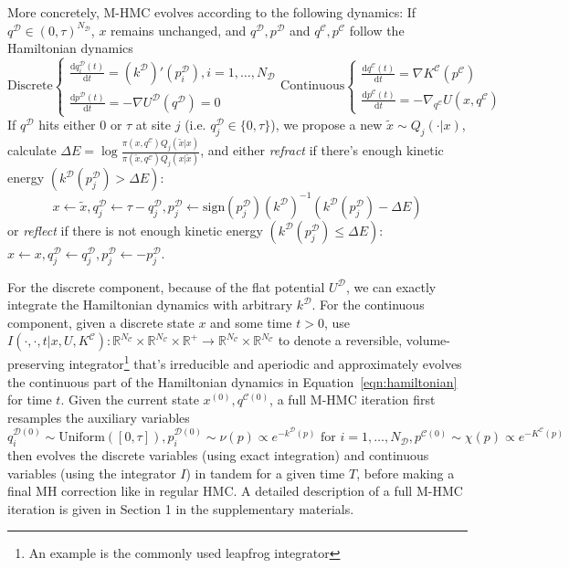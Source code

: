\documentclass{article}
\newcommand{\cald}{\mathcal{D}}
\newcommand{\calc}{\mathcal{C}}
\begin{document}
More concretely, M-HMC evolves according to the following dynamics: If $q^\cald \in (0, \tau)^{N_\cald}$, $x$ remains unchanged, and $q^\cald, p^\cald$ and $q^\calc, p^\calc$ follow the Hamiltonian dynamics
\begin{equation}\label{eqn:hamiltonian}
\text{Discrete}
\begin{cases} 
\frac{\mathrm{d} q_i^\cald(t)}{\mathrm{d} t} = (k^\cald)' (p^\cald_i), i=1, \ldots, N_\cald\\
\frac{\mathrm{d} p^\cald(t)}{\mathrm{d}t} = -\nabla U^\cald(q^\cald) = 0
\end{cases}
\text{Continuous}
\begin{cases}
\frac{\mathrm{d} q^\calc(t)}{\mathrm{d} t} = \nabla K^\calc(p^\calc)\\
\frac{\mathrm{d} p^\calc(t)}{\mathrm{d}t} = -\nabla_{q^\calc} U(x, q^\calc)
\end{cases}
\end{equation}
If $q^\cald$ hits either $0$ or $\tau$ at site $j$ (i.e. $q^\cald_j \in \{ 0, \tau \}$), we propose a new $\tilde{x}\sim Q_j(\cdot|x)$, calculate $\Delta E = \log \frac{\pi (x, q^\calc) Q_j (\tilde{x} |x)}{\pi (\tilde{x}, q^\calc) Q_j (x| \tilde{x})}$, and either \textit{refract} if there's enough kinetic energy $\left(k^\cald (p^\cald_j) > \Delta E\right)$:
\[x\leftarrow \tilde{x}, q_j^\cald\leftarrow \tau - q_j^\cald, p_j^\cald \leftarrow \text{sign}(p_j^\cald)(k^\cald)^{-1}(k^\cald(p_j^\cald) - \Delta E)\] 
or \textit{reflect} if there is not enough kinetic energy $\left(k^\cald (p^\cald_j) \leq \Delta E\right)$: $x\leftarrow x, q^\cald_j\leftarrow q^\cald_j, p^\cald_j\leftarrow -p^\cald_j$.

For the discrete component, because of the flat potential $U^\cald$, we can exactly integrate the Hamiltonian dynamics with arbitrary $k^\cald$. For the continuous component, given a discrete state $x$ and some time $t>0$, use $I(\cdot, \cdot, t | x, U, K^\calc): \mathbb{R}^{N_\calc}\times\mathbb{R}^{N_\calc}\times\mathbb{R}^+\rightarrow\mathbb{R}^{N_\calc}\times\mathbb{R}^{N_\calc}$ to denote a reversible, volume-preserving integrator\footnote{An example is the commonly used leapfrog integrator} that's irreducible and aperiodic and approximately evolves the continuous part of the Hamiltonian dynamics in Equation~\ref{eqn:hamiltonian} for time $t$. Given the current state $x^{(0)}, q^{\calc(0)}$, a full M-HMC iteration first resamples the auxiliary variables
\[q^{\cald(0)}_i \sim \text{Uniform}([0, \tau]), p^{\cald(0)}_i \sim \nu(p)\propto e^{-k^\cald(p)}\text{ for }i=1, \ldots, N_\cald, p^{\calc(0)} \sim \chi(p)\propto e^{-K^\calc(p)}\]
then evolves the discrete variables (using exact integration) and continuous variables (using the integrator $I$) in tandem for a given time $T$, before making a final MH correction like in regular HMC. A detailed description of a full M-HMC iteration is given in Section 1 in the supplementary materials.
\end{document}

